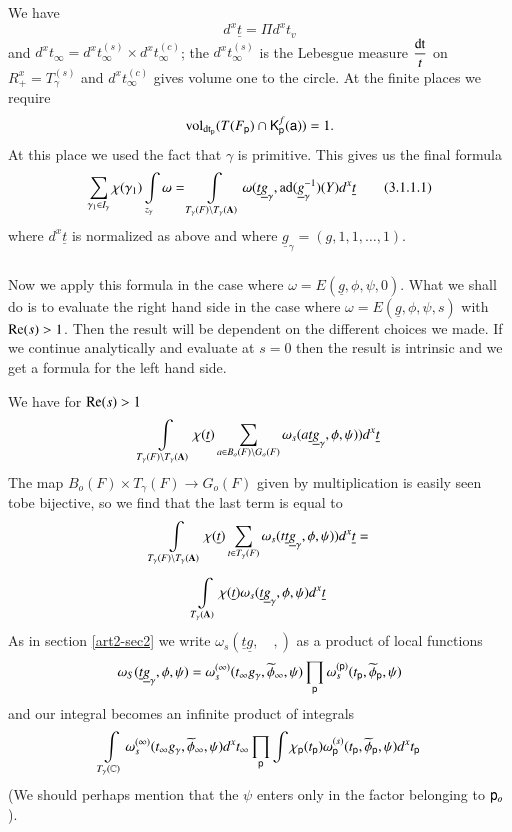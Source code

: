 We have
$$
d^{x}\underline{t}=\Pi d^{x}t_{v}
$$
and $d^{x}t_{\infty}=d^{x}t^{(s)}_{\infty}\times d^{x}t^{(c)}_{\infty}$; the $d^{x}t^{(s)}_{\infty}$ is the Lebesgue measure $\dfrac{\operatorname{dt}}{t}$ on $R^{x}_{+}=T^{(s)}_{\gamma}$ and $d^{x}t^{(c)}_{\infty}$ gives volume one to the circle. At the finite places we require
$$
\operatorname{vol}_{\operatorname{dt}_{\mathsf{p}}}(T(F_{\mathsf{p}})\cap \mathsf{K}^{f}_{\mathsf{p}}(\mathsf{a}))=1.
$$
At this place we used the fact that $\gamma$ is primitive. This gives us the final formula
\begin{equation*}
\sum\limits_{\gamma_{1}\in I_{\gamma}}\chi(\gamma_{1})\int\limits_{z_{\gamma}}\omega=\int\limits_{T_{\gamma}(F)\backslash T_{\gamma}(\mathbf{A})}\omega(\underline{t}\underline{g}_{\gamma},\operatorname{ad}(\underline{g}^{-1}_{\gamma})(Y)d^{x}\underline{t}\tag{3.1.1.1}\label{art2-eq3.1.1.1}
\end{equation*}
where $d^{x}\underline{t}$ is normalized as above and where $\underline{g}_{\gamma}=(g,1,1,\ldots,1)$.

\subsubsection{}\label{art2-sec3.1.3}
Now we apply this formula in the case where $\omega=E(\underline{g},\phi,\psi,0)$. What we shall do is to evaluate the right hand side in the case where $\omega=E(\underline{g},\phi,\psi,s)$ with $\mathrm{Re}(s)>1$. Then the result will be dependent on the different choices we made. If we continue analytically and evaluate at $s=0$ then the result is intrinsic and we get a formula for the left hand side.

We have for $\mathrm{Re}(s)>1$
$$
\int\limits_{T_{\gamma}(F)\backslash T_{\gamma}(\mathbf{A})}\chi(\underline{t})\sum\limits_{a\in B_{o}(F)\backslash G_{o}(F)}\omega_{s}(a\underline{t}\underline{g}_{\gamma},\phi,\psi))d^{x}\underline{t}
$$
The map $B_{o}(F)\times T_{\gamma}(F)\to G_{o}(F)$ given by multiplication is easily seen to\pageoriginale be bijective, so we find that the last term is equal to
\begin{gather*}
\int\limits_{T_{\gamma}(F)\backslash T_{\gamma}(\mathbf{A})}\chi(\underline{t})\sum\limits_{t\in T_{\gamma}(F)}\omega_{s}(t\underline{t}\underline{g}_{\gamma},\phi,\psi))d^{x}\underline{t}=\\[5pt]
\int\limits_{T_{\gamma}(\mathbf{A})}\chi(\underline{t})\omega_{s}(\underline{t}\underline{g}_{\gamma},\phi,\psi)d^{x}\underline{t}
\end{gather*}
As in section \ref{art2-sec2} we write $\omega_{s}(\underline{t}\underline{g},\quad,)$ as a product of local functions
$$
\omega_{S}(\underline{t}\underline{g}_{\gamma},\phi,\psi)=\omega^{(\infty)}_{s}(t_{\infty}g_{\gamma},\widetilde{\phi}_{\infty},\psi)\prod\limits_{\mathsf{p}}\omega^{(\mathsf{p})}_{s}(t_{\mathsf{p}},\widetilde{\phi}_{\mathsf{p}},\psi)
$$
and our integral becomes an infinite product of integrals
$$
\int\limits_{T_{\gamma}(\mathbb{C})}\omega_{s}^{(\infty)}(t_{\infty}g_{\gamma},\widetilde{\phi}_{\infty},\psi)d^{x}t_{\infty}\prod\limits_{\mathsf{p}}\int \chi_{\mathsf{p}}(t_{\mathsf{p}})\omega^{(s)}_{\mathsf{p}}(t_{\mathsf{p}},\widetilde{\phi}_{\mathsf{p}},\psi)d^{x}t_{\mathsf{p}}
$$
(We should perhaps mention that the $\psi$ enters only in the factor belonging to $\mathsf{p}_{o}$).

